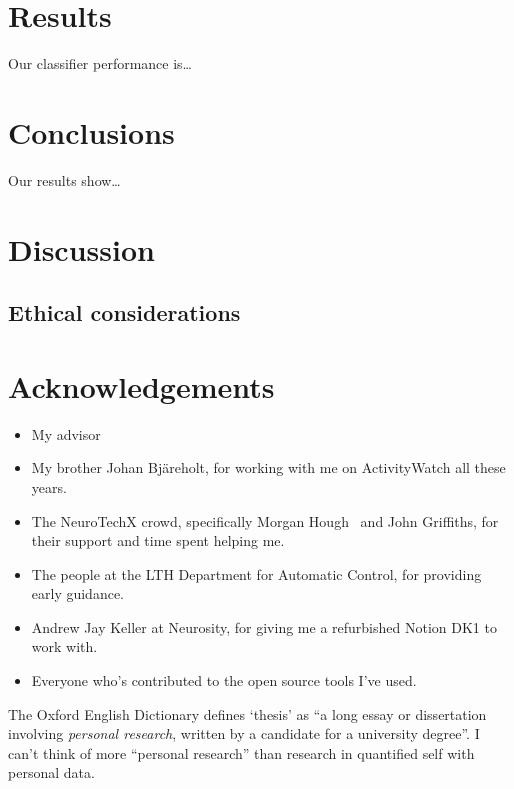 \documentclass[a4paper]{article}
\begin{document}
\begin{refsection}
\section{Results}

    Our classifier performance is\ldots

\section{Conclusions}

    Our results show\ldots

\section{Discussion}

    \subsection{Ethical considerations}


\section*{Acknowledgements}

\begin{itemize}
 \item My advisor
 \item My brother Johan Bjäreholt, for working with me on ActivityWatch all these years.
 \item The NeuroTechX crowd, specifically Morgan Hough~ and John Griffiths, for their support and time spent helping me.
 \item The people at the LTH Department for Automatic Control, for providing early guidance.
 \item Andrew Jay Keller at Neurosity, for giving me a refurbished Notion DK1 to work with.
 \item Everyone who's contributed to the open source tools I've used.
\end{itemize}

    The Oxford English Dictionary defines `thesis' as ``a long essay or dissertation involving \emph{personal research}, written by a candidate for a university degree''. I can't think of more ``personal research'' than research in quantified self with personal data.


\printbibliography[category=cited]

\nocite{*}
  {\list{}
     {\setlength{\leftmargin}{\bibhang}%
      \setlength{\itemindent}{-\leftmargin}%
      \setlength{\itemsep}{\bibitemsep}%
      \setlength{\parsep}{\bibparsep}}
  }
  {\endlist}
  {\item}
\printbibliography[notcategory=cited, env=bibnonum, heading=notcited]

\end{refsection}
\end{document}
